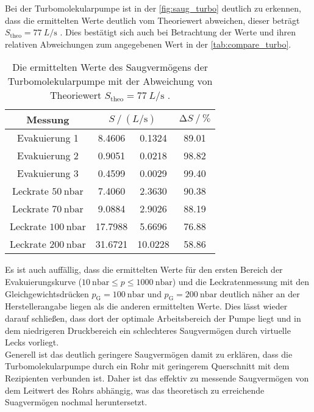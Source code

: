\noindent Bei der Turbomolekularpumpe ist in der \autoref{fig:saug_turbo} deutlich zu erkennen, dass die ermittelten Werte deutlich vom Theoriewert abweichen, dieser beträgt $S_\text{theo} =
\SI{77}{L\per\second}$ \cite{anleitung}. Dies bestätigt sich auch bei Betrachtung der Werte und ihren relativen Abweichungen zum angegebenen Wert in der \autoref{tab:compare_turbo}. 

\begin{table}
    \centering
    \caption{Die ermittelten Werte des Saugvermögens der Turbomolekularpumpe mit der Abweichung von Theoriewert $S_\text{theo} = \SI{77}{L\per\second}$ \cite{anleitung}.}
    \label{tab:compare_turbo}
    \begin{tabular}{c | S @{${}\pm{}$} S  S[table-format=4.2]}
        \toprule
        {Messung} &  & {$\increment S  \mathbin{/} \si{\percent}$} \\ 
        \midrule
        Evakuierung 1                   &  8.4606 &  0.1324 & 89.01 \\
        Evakuierung 2                   &  0.9051 &  0.0218 & 98.82 \\
        Evakuierung 3                   &  0.4599 &  0.0029 & 99.40 \\
        Leckrate $\SI{50}{\nano\bar}$   &  7.4060 &  2.3630 & 90.38 \\
        Leckrate $\SI{70}{\nano\bar}$   &  9.0884 &  2.9026 & 88.19 \\
        Leckrate $\SI{100}{\nano\bar}$  & 17.7988 &  5.6696 & 76.88 \\
        Leckrate $\SI{200}{\nano\bar}$  & 31.6721 & 10.0228 & 58.86 \\
        \bottomrule
    \end{tabular}
\end{table}

\noindent Es ist auch auffällig, dass die ermittelten Werte für den ersten Bereich der Evakuierungskurve ($\SI{10}{\nano\bar} \leq p \leq \SI{1000}{\nano\bar}$) und die Leckratenmessung 
mit den Gleichgewichtsdrücken $p_\text{G} = \SI{100}{\nano\bar}$ und $p_\text{G} = \SI{200}{\nano\bar}$ deutlich näher an der Herstellerangabe liegen als die anderen ermittelten Werte. 
Dies lässt wieder darauf schließen, dass dort der optimale Arbeitsbereich der Pumpe liegt und in dem niedrigeren Druckbereich ein schlechteres Saugvermögen durch virtuelle Lecks vorliegt. \\
Generell ist das deutlich geringere Saugvermögen damit zu erklären, dass die Turbomolekularpumpe durch ein Rohr mit geringerem Querschnitt mit dem Rezipienten verbunden ist. Daher ist das 
effektiv zu messende Saugvermögen von dem Leitwert des Rohrs abhängig, was das theoretisch zu erreichende Suagvermögen nochmal heruntersetzt. 

